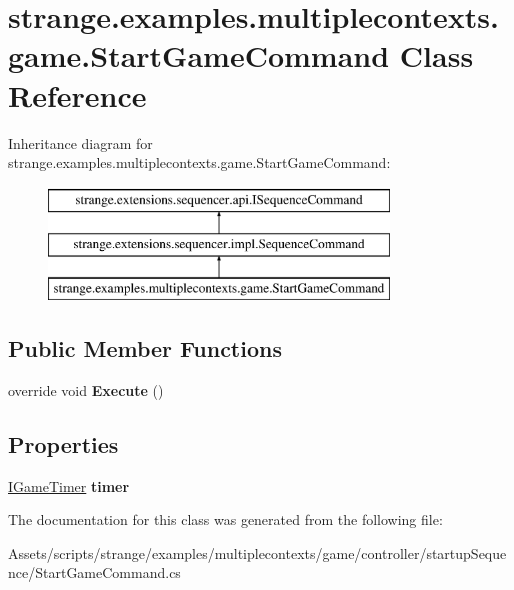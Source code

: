 \hypertarget{classstrange_1_1examples_1_1multiplecontexts_1_1game_1_1_start_game_command}{\section{strange.\-examples.\-multiplecontexts.\-game.\-Start\-Game\-Command Class Reference}
\label{classstrange_1_1examples_1_1multiplecontexts_1_1game_1_1_start_game_command}
}
Inheritance diagram for strange.\-examples.\-multiplecontexts.\-game.\-Start\-Game\-Command\-:\begin{figure}[H]
\begin{center}
\leavevmode
\includegraphics[height=3.000000cm]{classstrange_1_1examples_1_1multiplecontexts_1_1game_1_1_start_game_command}
\end{center}
\end{figure}
\subsection*{Public Member Functions}
\begin{DoxyCompactItemize}
\item 
\hypertarget{classstrange_1_1examples_1_1multiplecontexts_1_1game_1_1_start_game_command_a6e20bcd910a87e3f5fa9418706d2c9b0}{override void {\bfseries Execute} ()}\label{classstrange_1_1examples_1_1multiplecontexts_1_1game_1_1_start_game_command_a6e20bcd910a87e3f5fa9418706d2c9b0}

\end{DoxyCompactItemize}
\subsection*{Properties}
\begin{DoxyCompactItemize}
\item 
\hypertarget{classstrange_1_1examples_1_1multiplecontexts_1_1game_1_1_start_game_command_abb1c0897e9434052c902a1200fddf74f}{\hyperlink{interfacestrange_1_1examples_1_1multiplecontexts_1_1game_1_1_i_game_timer}{I\-Game\-Timer} {\bfseries timer}}\label{classstrange_1_1examples_1_1multiplecontexts_1_1game_1_1_start_game_command_abb1c0897e9434052c902a1200fddf74f}

\end{DoxyCompactItemize}


The documentation for this class was generated from the following file\-:\begin{DoxyCompactItemize}
\item 
Assets/scripts/strange/examples/multiplecontexts/game/controller/startup\-Sequence/Start\-Game\-Command.\-cs\end{DoxyCompactItemize}
